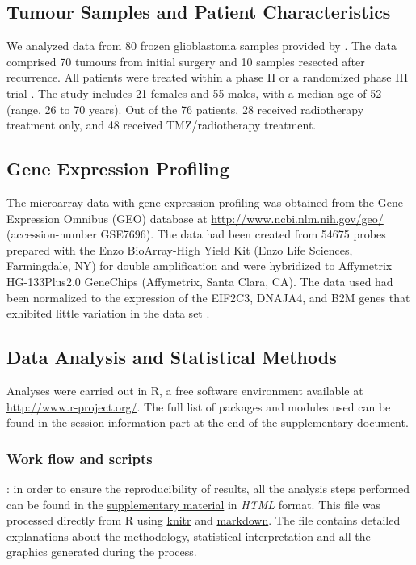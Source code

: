 \documentclass[9pt,twocolumn,twoside]{gsajnl}
\begin{document}
\subsection*{Tumour Samples and Patient Characteristics}

We analyzed data from 80 frozen glioblastoma samples provided by \cite{Murat2008}. The data comprised 70 tumours from initial surgery and 10 samples resected after recurrence. All patients were treated within a phase II or a randomized phase III trial \citep{Stupp2002,Stupp2005}. The study includes 21 females and 55 males, with a median age of 52 (range, 26 to 70 years). Out of the 76 patients, 28 received radiotherapy treatment only, and 48 received TMZ/radiotherapy treatment. 

\subsection*{Gene Expression Profiling}

The microarray data with gene expression profiling was obtained from the Gene Expression Omnibus (GEO) database at \url{http://www.ncbi.nlm.nih.gov/geo/} (accession-number GSE7696). The data had been created from 54675 probes prepared with the Enzo BioArray-High Yield Kit (Enzo Life Sciences, Farmingdale, NY) for double amplification and were hybridized to Affymetrix HG-133Plus2.0 GeneChips (Affymetrix, Santa Clara, CA). The data used had been normalized to the expression of the EIF2C3, DNAJA4, and B2M genes that exhibited little variation in the data set \citep{Murat2008}.

\subsection*{Data Analysis and Statistical Methods}
Analyses were carried out in R, a free software environment available at \url{http://www.r-project.org/}. The full list of packages and modules used can be found in the session information part at the end of the supplementary document. 

\subsubsection*{Work flow and scripts}: in order to ensure the reproducibility of results, all the analysis steps performed can be found in the \href{http://ieoproject.tk/ieo/supplementary/workflow_report.html}{supplementary material} in \textit{HTML} format. This file was processed directly from R using 
\href{http://cran.r-project.org/web/packages/knitr/index.html}{knitr} and \href{http://cran.r-project.org/web/packages/markdown/index.html}{markdown}. The file contains detailed explanations about the methodology, statistical interpretation and all the graphics generated during the process. 
\end{document}
